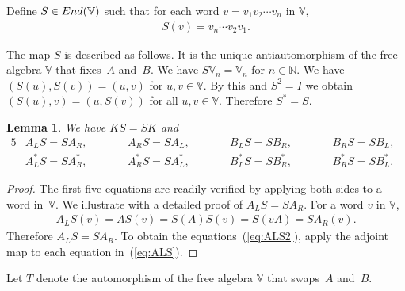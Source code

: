 \documentclass[11pt]{article}
\numberwithin{equation}{section}
\numberwithin{equation}{section}
\newtheorem{Lemma}[Theorem]{Lemma}
\begin{document}
{\begin{Definition}\label{def:S}Define $S \in {\rm End}(\mathbb V)$ such that for each word $v = v_1 v_2 \cdots v_n$ in $\mathbb V$,
\begin{gather*}
S(v) = v_n \cdots v_2 v_1.
\end{gather*}
\end{Definition}
The map $S$ is described as follows. It is the unique antiautomorphism of the free algebra $\mathbb V$
that fixes~$A$ and~$B$. We have
$S \mathbb V_n = \mathbb V_n$ for $n \in \mathbb N$.
We have $(S(u), S(v))= (u,v) $ for $u,v \in \mathbb V$. By this and
$S^2=I$ we obtain
$(S(u),v)= (u,S(v))$ for all $u,v \in \mathbb V$. Therefore
$S^*=S$.
\begin{Lemma}\label{lem:scom} We have $KS=SK$ and
\begin{alignat}{5}
&A_L S = S A_R, \qquad &&
A_R S = S A_L, \qquad &&
B_L S = S B_R, \qquad &&
B_R S = S B_L, &\label{eq:ALS}
\\
& A^*_L S = S A^*_R, \qquad &&
A^*_R S = S A^*_L, \qquad &&
B^*_L S = S B^*_R, \qquad &&
B^*_R S = S B^*_L. &\label{eq:ALS2}
\end{alignat}
\end{Lemma}
\begin{proof}The first five equations are readily verified by applying both sides to
a word in~$\mathbb V$. We illustrate with a detailed proof of
$A_LS=SA_R$.
For a word $v$ in $\mathbb V$,
\begin{gather*}
A_L S(v) = AS(v) = S(A)S(v)= S(vA) = S A_R(v).
\end{gather*}
Therefore
$A_LS=SA_R$.
To obtain the equations~(\ref{eq:ALS2}), apply the adjoint map to each equation in~(\ref{eq:ALS}).
\end{proof}

\begin{Definition}\label{def:T}Let $T$ denote the automorphism of the free algebra $\mathbb V$ that
swaps~$A$ and~$B$.
\end{Definition}

}
\end{document}
